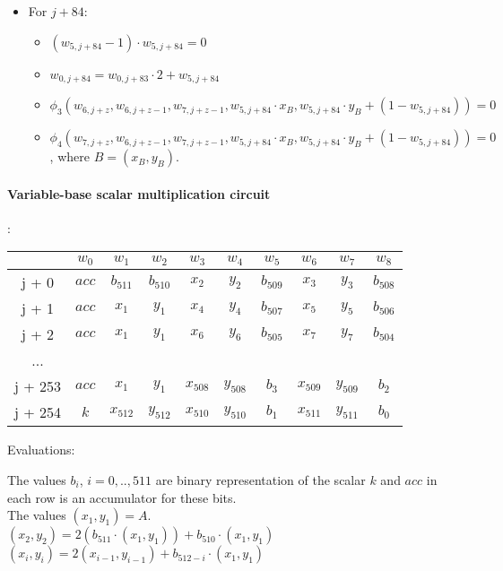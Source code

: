 \begin{itemize}
    \item For $j + 84$:
        \begin{itemize}
        	 \item $(w_{5, j + 84} - 1) \cdot w_{5, j + 84} = 0$ 
            \item $w_{0, j + 84} = w_{0, j + 83} \cdot 2 + w_{5, j + 84}$
            \item $\phi_3(w_{6, j + z}, w_{6, j + z - 1}, w_{7, j + z - 1}, w_{5, j + 84} \cdot x_B, w_{5, j + 84} \cdot y_B + (1 - w_{5, j + 84}) ) = 0$
            \item $\phi_4(w_{7, j + z}, w_{6, j + z - 1}, w_{7, j + z - 1}, w_{5, j + 84} \cdot x_B, w_{5, j + 84} \cdot y_B + (1 - w_{5, j + 84}) ) = 0$, where $B = (x_B, y_B)$.
        \end{itemize}
\end{itemize}

\paragraph{Variable-base scalar multiplication circuit}:
\begin{center}
    \begin{tabular}{ c|c|c|c|c|c|c|c|c|c }
        & $w_0$  & $w_1$  & $w_2$  & $w_3$  & $w_4$  & $w_5$ & $w_6$ & $w_7$ & $w_8$  \\
        \hline
        j + 0  & $acc$  & $b_{511}$ & $b_{510}$ & $x_2$   & $y_2$ & $b_{509}$  & $x_3$ & $y_3$ & $b_{508}$    \\
        j + 1  & $acc$ & $x_1$  & $ y_1$  & $x_4$ & $ y_4$ & $b_{507}$  & $x_5$ & $y_5$ & $b_{506}$ \\
        j + 2  & $acc$  & $x_1$ & $y_1$  & $x_6$ & $y_6$ & $b_{505}$ & $x_7$ & $y_7$  & $b_{504}$  \\
        ...     &             &            &           &             &           \\
        j + 253  & $acc$ & $x_1$  & $ y_1$  & $x_{508}$ & $ y_{508}$ & $b_{3}$  & $x_{509}$ & $y_{509}$ & $b_{2}$ \\
        j + 254  & $k$ & $x_{512}$ & $y_{512}$ & $x_{510}$ & $y_{510}$ & $b_{1}$   & $x_{511}$ & $y_{511}$  & $b_{0}$    \\
    \end{tabular}
\end{center}
Evaluations:
\begin{center}
The values $b_i$, $i = 0,.., 511$ are binary representation of the scalar $k$ and $acc$ in each row is an accumulator for these bits.\\
 The values $(x_1, y_1) = A$.\\
 $(x_2, y_2) = 2 (b_{511} \cdot (x_1, y_1)) + b_{510} \cdot (x_1, y_1)$ \\
  $(x_i, y_i) = 2 (x_{i - 1}, y_{i - 1}) + b_{512 - i} \cdot (x_1, y_1)$ \\
\end{center}

